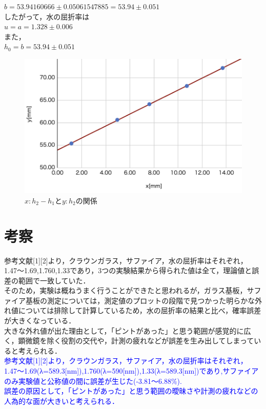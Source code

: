 \documentclass[a4paper,1pt]{jsarticle}
\newcommand{\blue}[1]{\textcolor{blue}{#1}}
\begin{document}
$b=53.94160666\pm0.05061547885=53.94\pm0.051$\\

したがって，水の屈折率は\\

$u=a=1.328\pm0.006$\\

また，\\

$h_0=b=53.94\pm0.051$\\

\begin{figure}[h]
  \begin{center}
  \includegraphics[width=150mm]{actC.png}
  \caption{$x:h_2-h_1とy:h_2の関係$}
  \end{center}
\end{figure}

\clearpage

 
 
\section{考察}

 参考文献[1][2]より，クラウンガラス，サファイア，水の屈折率はそれぞれ，1.47〜1.69,1.760,1.33であり，3つの実験結果から得られた値は全て，理論値と誤差の範囲で一致していた．\\
 
 そのため，実験は概ねうまく行うことができたと思われるが，ガラス基板，サファイア基板の測定については，測定値のプロットの段階で見つかった明らかな外れ値については排除して計算しているため，水の屈折率の結果と比べ，確率誤差が大きくなっている．\\

 大きな外れ値が出た理由として，「ピントがあった」と思う範囲が感覚的に広く，顕微鏡を除く役割の交代や，計測の疲れなどが誤差を生み出してしまっていると考えられる．\\

 \blue{参考文献[1][2]より，クラウンガラス，サファイア，水の屈折率はそれぞれ，1.47〜1.69(λ=589.3[nm]),1.760(λ=590[nm]),1.33(λ=589.3[nm])であり,サファイアのみ実験値と公称値の間に誤差が生じた(-3.81〜6.88\%).}\\

 \blue{誤差の原因として，「ピントがあった」と思う範囲の曖昧さや計測の疲れなどの人為的な面が大きいと考えられる．}
\end{document}
